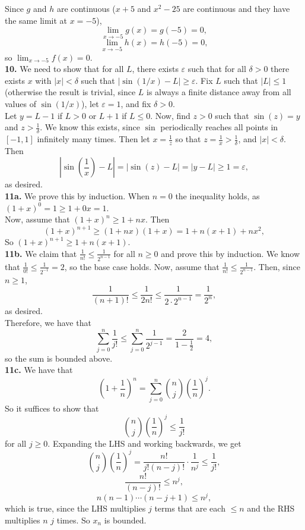 \documentclass{article}
\newcommand{\eps}{\varepsilon}
\begin{document}
Since $g$ and $h$ are continuous ($x + 5$ and $x^2 - 25$ are continuous and they have the same limit at $x = -5$), $$\lim_{x \to -5} g(x) = g(-5) = 0,$$
$$\lim_{x \to -5} h(x) = h(-5) = 0,$$
so $\lim_{x \to -5} f(x) = 0$. \\

\textbf{10.} We need to show that for all $L$, there exists $\eps$ such that for all $\delta > 0$ there exists $x$ with $|x| < \delta$ such that $|\sin(1/x) - L| \ge \eps$. Fix $L$ such that $|L| \le 1$ (otherwise the result is trivial, since $L$ is always a finite distance away from all values of $\sin(1/x)$), let $\eps = 1$, and fix $\delta > 0$. \\

Let $y = L - 1$ if $L > 0$ or $L + 1$ if $L \le 0$. Now, find $z > 0$ such that $\sin(z) = y$ and $z > \frac{1}{\delta}$. We know this exists, since $\sin$ periodically reaches all points in $[-1, 1]$ infinitely many times. Then let $x = \frac{1}{z}$ so that $z = \frac{1}{x} > \frac{1}{\delta}$, and $|x| < \delta$. Then
$$\left|\sin\left(\frac{1}{x}\right) - L\right| = |\sin(z) - L| = |y - L| \ge 1 = \eps,$$
as desired. \\

\textbf{11a.} We prove this by induction. When $n = 0$ the inequality holds, as $(1 + x)^0 = 1 \ge 1 + 0x = 1$. \\

Now, assume that $(1 + x)^n \ge 1 + nx$. Then
$$(1 + x)^{n + 1} \ge (1 + nx)(1 + x) = 1 + n(x + 1) + nx^2,$$
So $(1 + x)^{n + 1} \ge 1 + n(x + 1)$. \\

\textbf{11b.} We claim that $\frac{1}{n!} \le \frac{1}{2^{n - 1}}$ for all $n \ge 0$ and prove this by induction. We know that $\frac{1}{0!} \le \frac{1}{2^{-1}} = 2$, so the base case holds. Now, assume that $\frac{1}{n!} \le \frac{1}{2^{n - 1}}$. Then, since $n \ge 1$,
$$\frac{1}{(n + 1)!} \le \frac{1}{2n!} \le \frac{1}{2\cdot 2^{n - 1}} = \frac{1}{2^n},$$
as desired. \\

Therefore, we have that
$$\sum_{j = 0}^n \frac{1}{j!} \le \sum_{j = 0}^n \frac{1}{2^{j - 1}} = \frac{2}{1 - \frac{1}{2}} = 4,$$
so the sum is bounded above. \\

\textbf{11c.} We have that
$$\left(1 + \frac{1}{n}\right)^n = \sum_{j = 0}^n \binom{n}{j}\left(\frac{1}{n}\right)^j.$$
So it suffices to show that
$$\binom{n}{j}\left(\frac{1}{n}\right)^j \le \frac{1}{j!}$$
for all $j \ge 0$. Expanding the LHS and working backwards, we get
$$\binom{n}{j}\left(\frac{1}{n}\right)^j = \frac{n!}{j!(n - j)!} \cdot \frac{1}{n^j} \le \frac{1}{j!},$$
$$\frac{n!}{(n - j)!} \le n^j,$$
$$n(n - 1)\cdots(n - j + 1) \le n^j,$$
which is true, since the LHS multiplies $j$ terms that are each $\le n$ and the RHS multiplies $n$ $j$ times. So $x_n$ is bounded.
\end{document}

